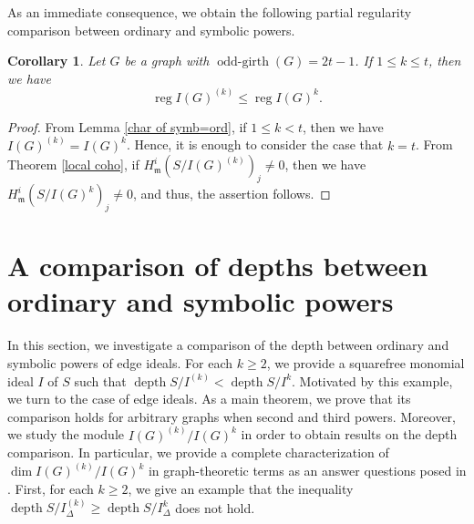 \documentclass[12pt]{amsart}
\newtheorem{cor}[thm]{Corollary}
\theoremstyle{definition}
\theoremstyle{remark}
\DeclareMathOperator{\depth}{depth}
\DeclareMathOperator{\reg}{reg}
\DeclareMathOperator{\ogirth}{odd-girth}
\begin{document}
As an immediate consequence, we obtain the following partial regularity comparison between ordinary and symbolic powers.

\begin{cor}\label{ineq of reg}
Let $G$ be a graph with $\ogirth(G)=2t-1$. If $1\leq k\leq t$, then we have $$\reg I(G)^{(k)}\leq\reg I(G)^{k}.$$ 
\end{cor}
\begin{proof}
From Lemma \ref{char of symb=ord}, if $1\leq k<t$, then we have $I(G)^{(k)}=I(G)^{k}$. Hence, it is enough to consider the case that $k=t$. From Theorem \ref{local coho}, if $H_{\mathfrak{m}}^{i}(S/I(G)^{(k)})_{j}\neq0$, then we have $H_{\mathfrak{m}}^{i}(S/I(G)^{k})_{j}\neq0$, and thus, the assertion follows. 
\end{proof}



\section{A comparison of depths between ordinary and symbolic powers}\label{depth}

In this section, we investigate a comparison of the depth between ordinary and symbolic powers of edge ideals. For each $k\geq2$, we provide a squarefree monomial ideal $I$ of $S$ such that $\depth S/I^{(k)}<\depth S/I^{k}$. Motivated by this example, we turn to the case of edge ideals. As a main theorem, we prove that its comparison holds for arbitrary graphs when second and third powers. Moreover, we study the module $I(G)^{(k)}/I(G)^{k}$ in order to obtain results on the depth comparison. In particular, we provide a complete characterization of $\dim I(G)^{(k)}/I(G)^{k}$ in graph-theoretic terms as an answer questions posed in \cite{hm2026}. First, for each $k\geq2$, we give an example that the inequality $\depth S/I_{\Delta}^{(k)}\geq \depth S/I_{\Delta}^{k}$ does not hold.
\end{document}
